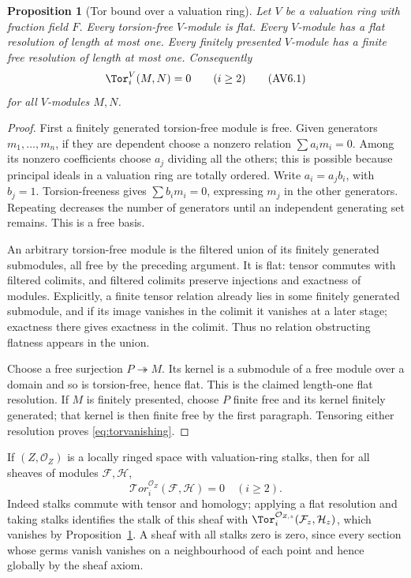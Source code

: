 \documentclass[11pt,a4paper]{article}
\newtheorem{proposition}[theorem]{Proposition}
\theoremstyle{definition}\newtheorem{definition}[theorem]{Definition}
\begin{document}
\begin{proposition}[Tor bound over a valuation ring]
\label{prop:valuation-tor}
Let $V$ be a valuation ring with fraction field $F$. Every torsion-free
$V$-module is flat. Every $V$-module has a flat resolution of length at
most one. Every finitely presented $V$-module has a finite free
resolution of length at most one. Consequently
\[
 \Tor_i^V(M,N)=0\qquad(i\ge2)
 \tag{AV6.1}\label{eq:torvanishing}
\]
for all $V$-modules $M,N$.
\end{proposition}
\begin{proof}
First a finitely generated torsion-free module is free. Given generators
$m_1,\ldots,m_n$, if they are dependent choose a nonzero relation
$\sum a_i m_i=0$. Among its nonzero coefficients choose $a_j$ dividing
all the others; this is possible because principal ideals in a valuation
ring are totally ordered. Write $a_i=a_jb_i$, with $b_j=1$.
Torsion-freeness gives $\sum b_i m_i=0$, expressing $m_j$ in the other
generators. Repeating decreases the number of generators until an
independent generating set remains. This is a free basis.

An arbitrary torsion-free module is the filtered union of its finitely
generated submodules, all free by the preceding argument. It is flat:
tensor commutes with filtered colimits, and filtered colimits preserve
injections and exactness of modules. Explicitly, a finite tensor relation
already lies in some finitely generated submodule, and if its image
vanishes in the colimit it vanishes at a later stage; exactness there
gives exactness in the colimit. Thus no relation obstructing flatness
appears in the union.

Choose a free surjection $P\twoheadrightarrow M$. Its kernel is a
submodule of a free module over a domain and so is torsion-free, hence
flat. This is the claimed length-one flat resolution. If $M$ is finitely
presented, choose $P$ finite free and its kernel finitely generated;
that kernel is then finite free by the first paragraph. Tensoring either
resolution proves \eqref{eq:torvanishing}.
\end{proof}

If $(Z,\mathcal O_Z)$ is a locally ringed space with valuation-ring
stalks, then for all sheaves of modules $\mathcal F,\mathcal H$,
\[
 \mathcal{T}or_i^{\mathcal O_Z}(\mathcal F,\mathcal H)=0\quad(i\ge2).
 \tag{AV6.2}\label{eq:sheaf-tor}
\]
Indeed stalks commute with tensor and homology; applying a flat resolution
and taking stalks identifies the stalk of this sheaf with
$\Tor_i^{\mathcal O_{Z,z}}(\mathcal F_z,\mathcal H_z)$, which vanishes
by Proposition~\ref{prop:valuation-tor}. A sheaf with all stalks zero is
zero, since every section whose germs vanish vanishes on a neighbourhood
of each point and hence globally by the sheaf axiom.
\end{document}
